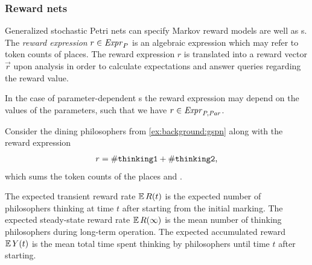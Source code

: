 \subsubsection{Reward nets}

Generalized stochastic Petri nets can specify Markov reward models are well as s. The \emph{reward expression} \(r \in \textrm{\itshape Expr\/}_P\) is an algebraic expression which may refer to token counts of places. The reward expression \(r\) is translated into a reward vector \(\vec{r}\) upon analysis in order to calculate expectations and answer queries regarding the reward value.

In the case of parameter-dependent s the reward expression may depend on the values of the parameters, such that we have \(r \in \textrm{\itshape Expr\/}_{P, \textrm{\itshape Par\/}}\).

\begin{runningExample}
  Consider the dining philosophers  from \vref{ex:background:gspn} along with the reward expression
  \begin{equation}
    r = \#\texttt{\upshape thinking1} + \#\texttt{\upshape thinking2} \text,
  \end{equation}
  which sums the token counts of the places  and .

  The expected transient reward rate \(\operatorname{\mathbb{E}} R(t)\) is the expected number of philosophers thinking at time \(t\) after starting from the initial marking. The expected steady-state reward rate \(\operatorname{\mathbb{E}} R(\infty)\) is the mean number of thinking philosophers during long-term operation. The expected accumulated reward \(\operatorname{\mathbb{E}} Y(t)\) is the mean total time spent thinking by philosophers until time \(t\) after starting.
\end{runningExample}


